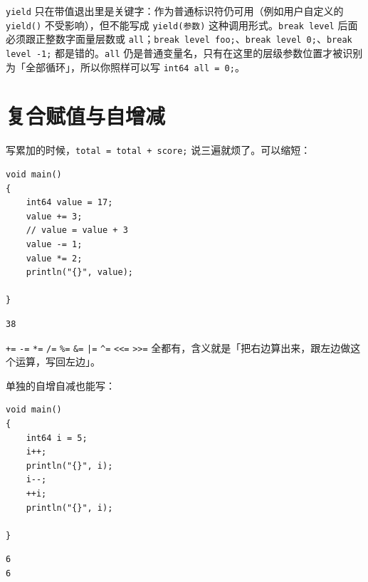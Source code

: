 \texttt{yield} 只在带值退出里是关键字：作为普通标识符仍可用（例如用户自定义的 \texttt{yield(\allowbreak{})\allowbreak{}} 不受影响），但不能写成 \texttt{yield(\allowbreak{}参数)\allowbreak{}} 这种调用形式。\texttt{break level} 后面必须跟正整数字面量层数或 \texttt{all}；\texttt{break level foo;}、\texttt{break level 0;}、\texttt{break level -1;} 都是错的。\texttt{all} 仍是普通变量名，只有在这里的层级参数位置才被识别为「全部循环」，所以你照样可以写 \texttt{int64 all =\allowbreak{} 0;}。

\section{复合赋值与自增减}

写累加的时候，\texttt{total =\allowbreak{} total + score;} 说三遍就烦了。可以缩短：

\par
\medskip
\begin{lstlisting}[style=chali]
void main()
{
    int64 value = 17;
    value += 3;
    // value = value + 3
    value -= 1;
    value *= 2;
    println("{}", value);

}
\end{lstlisting}
\par
\medskip

\par
\medskip
\begin{lstlisting}[style=out]
38
\end{lstlisting}
\par
\medskip

\texttt{+=\allowbreak{}} \texttt{-=\allowbreak{}} \texttt{*=\allowbreak{}} \texttt{/\allowbreak{}=\allowbreak{}} \texttt{\%=\allowbreak{}} \texttt{\&=\allowbreak{}} \texttt{|=\allowbreak{}} \texttt{\textasciicircum{}=\allowbreak{}} \texttt{<\allowbreak{}<\allowbreak{}=\allowbreak{}} \texttt{>\allowbreak{}>\allowbreak{}=\allowbreak{}} 全都有，含义就是「把右边算出来，跟左边做这个运算，写回左边」。

单独的自增自减也能写：

\par
\medskip
\begin{lstlisting}[style=chali]
void main()
{
    int64 i = 5;
    i++;
    println("{}", i);
    i--;
    ++i;
    println("{}", i);

}
\end{lstlisting}
\par
\medskip

\par
\medskip
\begin{lstlisting}[style=out]
6
6
\end{lstlisting}
\par
\medskip

